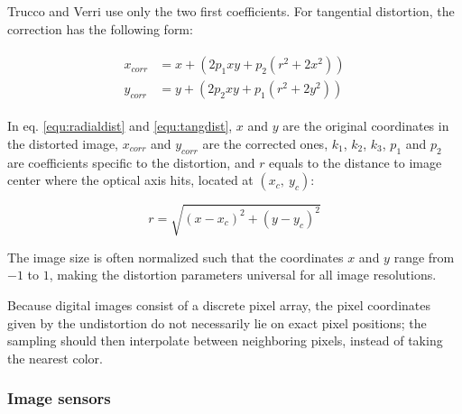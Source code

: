 

Trucco and Verri \cite{trucco1998introductory} use only the two first coefficients. For tangential distortion, the correction has the following form:

\begin{align} \label{equ:tangdist} \begin{split}
x_{corr} &= x + (2 p_1 x y + p_2 (r^2 + 2 x^2))\\
y_{corr} &= y + (2 p_2 x y + p_1 (r^2 + 2 y^2))
\end{split} \end{align}

In eq. \ref{equ:radialdist} and \ref{equ:tangdist}, $x$ and $y$ are the original coordinates in the distorted image, $x_{corr}$ and $y_{corr}$ are the corrected ones, $k_1$, $k_2$, $k_3$, $p_1$ and $p_2$ are coefficients specific to the distortion, and $r$ equals to the distance to image center where the optical axis hits, located at $(x_c,~y_c)$:

\begin{equation}
r = \sqrt{(x - x_c)^2 + (y - y_c)^2}
\end{equation}

The image size is often normalized such that the coordinates $x$ and $y$ range from $-1$ to $1$, making the distortion parameters universal for all image resolutions.

Because digital images consist of a discrete pixel array, the pixel coordinates given by the undistortion do not necessarily lie on exact pixel positions;
the sampling should then interpolate between neighboring pixels, instead of taking the nearest color.





\subsubsection{Image sensors} %

